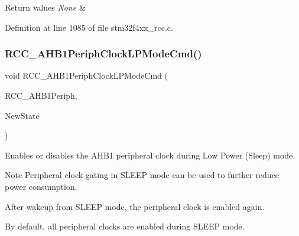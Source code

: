 \begin{DoxyRetVals}{Return values}
{\em None} & \\
\hline
\end{DoxyRetVals}


Definition at line 1085 of file stm32f4xx\+\_\+rcc.\+c.

\mbox{\label{group___r_c_c_ga5cd0d5adbc7496d7005b208bd19ce255}} 
\subsubsection{\texorpdfstring{R\+C\+C\+\_\+\+A\+H\+B1\+Periph\+Clock\+L\+P\+Mode\+Cmd()}{RCC\_AHB1PeriphClockLPModeCmd()}}
{\footnotesize\ttfamily void R\+C\+C\+\_\+\+A\+H\+B1\+Periph\+Clock\+L\+P\+Mode\+Cmd (\begin{DoxyParamCaption}\item[{uint32\+\_\+t}]{R\+C\+C\+\_\+\+A\+H\+B1\+Periph,  }\item[{Functional\+State}]{New\+State }\end{DoxyParamCaption})}



Enables or disables the A\+H\+B1 peripheral clock during Low Power (Sleep) mode. 

\begin{DoxyNote}{Note}
Peripheral clock gating in S\+L\+E\+EP mode can be used to further reduce power consumption. 

After wakeup from S\+L\+E\+EP mode, the peripheral clock is enabled again. 

By default, all peripheral clocks are enabled during S\+L\+E\+EP mode. 
\end{DoxyNote}

